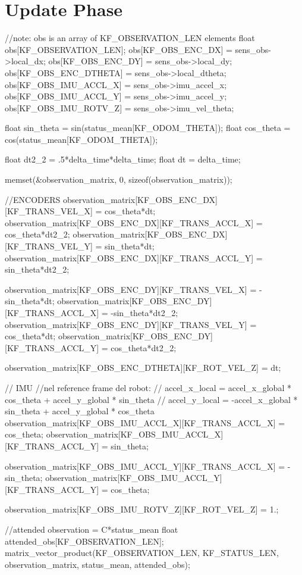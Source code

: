 \section{Update Phase}
\begin{ccode}
	//note: obs is an array of KF_OBSERVATION_LEN elements
	float obs[KF_OBSERVATION_LEN];
	obs[KF_OBS_ENC_DX] = sens_obs->local_dx;
	obs[KF_OBS_ENC_DY] = sens_obs->local_dy;
	obs[KF_OBS_ENC_DTHETA] = sens_obs->local_dtheta;
	obs[KF_OBS_IMU_ACCL_X] = sens_obs->imu_accel_x;
	obs[KF_OBS_IMU_ACCL_Y] = sens_obs->imu_accel_y;
	obs[KF_OBS_IMU_ROTV_Z] = sens_obs->imu_vel_theta;


	float sin_theta = sin(status_mean[KF_ODOM_THETA]);
	float cos_theta = cos(status_mean[KF_ODOM_THETA]);
	
	float dt2_2 = .5*delta_time*delta_time;
	float dt = delta_time;
	
	memset(&observation_matrix, 0, sizeof(observation_matrix));
	
	//ENCODERS
	observation_matrix[KF_OBS_ENC_DX][KF_TRANS_VEL_X] = cos_theta*dt;
	observation_matrix[KF_OBS_ENC_DX][KF_TRANS_ACCL_X] = cos_theta*dt2_2;
	observation_matrix[KF_OBS_ENC_DX][KF_TRANS_VEL_Y] = sin_theta*dt;
	observation_matrix[KF_OBS_ENC_DX][KF_TRANS_ACCL_Y] = sin_theta*dt2_2;
		
	observation_matrix[KF_OBS_ENC_DY][KF_TRANS_VEL_X] = -sin_theta*dt;
	observation_matrix[KF_OBS_ENC_DY][KF_TRANS_ACCL_X] = -sin_theta*dt2_2;
	observation_matrix[KF_OBS_ENC_DY][KF_TRANS_VEL_Y] = cos_theta*dt;
	observation_matrix[KF_OBS_ENC_DY][KF_TRANS_ACCL_Y] = cos_theta*dt2_2;
	
	observation_matrix[KF_OBS_ENC_DTHETA][KF_ROT_VEL_Z] = dt;
	
	
	// IMU
	//nel reference frame del robot:
		//	accel_x_local = accel_x_global * cos_theta + accel_y_global * sin_theta
		//	accel_y_local = -accel_x_global * sin_theta + accel_y_global * cos_theta
	observation_matrix[KF_OBS_IMU_ACCL_X][KF_TRANS_ACCL_X] = cos_theta;
	observation_matrix[KF_OBS_IMU_ACCL_X][KF_TRANS_ACCL_Y] = sin_theta;
	
	observation_matrix[KF_OBS_IMU_ACCL_Y][KF_TRANS_ACCL_X] = -sin_theta;
	observation_matrix[KF_OBS_IMU_ACCL_Y][KF_TRANS_ACCL_Y] = cos_theta;
	
	observation_matrix[KF_OBS_IMU_ROTV_Z][KF_ROT_VEL_Z] = 1.;
	
	//attended observation = C*status_mean
	float attended_obs[KF_OBSERVATION_LEN];
	matrix_vector_product(KF_OBSERVATION_LEN, KF_STATUS_LEN, observation_matrix, status_mean, attended_obs);	
	

\end{ccode}
